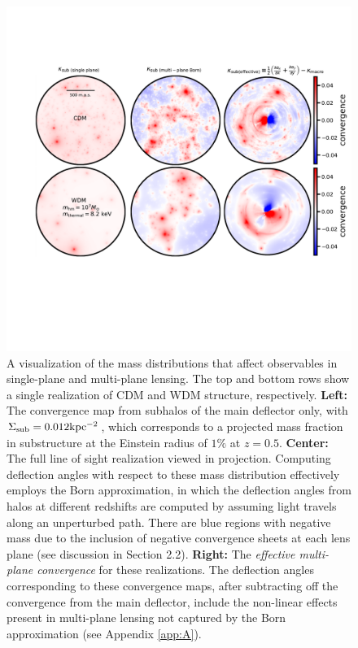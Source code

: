 \begin{figure}
	\includegraphics[clip,trim=1cm 8.2cm 0.5cm
	5cm,width=.96\textwidth,keepaspectratio]{./figures_LOSforward/nonlinear_kappa_plot.pdf}
	\caption{\label{fig:kappa_effective} A visualization of the mass distributions that affect observables in single-plane and multi-plane lensing. The top and bottom rows show a single realization of CDM and WDM structure, respectively. {\bf{Left:}} The convergence map from subhalos of the main deflector only, with $\Sigma_{\rm{sub}} = 0.012 \rm{kpc^{-2}}$, which corresponds to a projected mass fraction in substructure at the Einstein radius of $1\%$ at $z = 0.5$. {\bf{Center:}} The full line of sight realization viewed in projection. Computing deflection angles with respect to these mass distribution effectively employs the Born approximation, in which the deflection angles from halos at different redshifts are computed by assuming light travels along an unperturbed path. There are blue regions with negative mass due to the inclusion of negative convergence sheets at each lens plane (see discussion in Section 2.2). {\bf{Right:}} The \textit{effective multi-plane convergence} for these realizations. The deflection angles corresponding to these convergence maps, after subtracting off the convergence from the main deflector, include the non-linear effects present in multi-plane lensing not captured by the Born approximation (see Appendix \ref{app:A}).}
\end{figure}	
